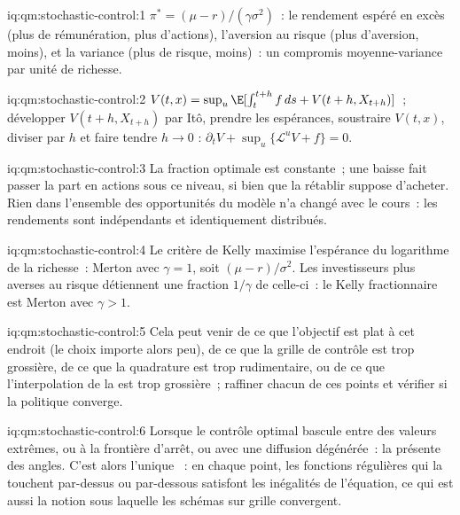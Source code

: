 \begin{solution}{iq:qm:stochastic-control:1}
$\pi^* = (\mu - r)/(\gamma\sigma^2)$~: le rendement espéré en excès (plus de rémunération, plus d'actions), l'aversion au risque (plus d'aversion,
moins), et la variance (plus de risque, moins)~: un compromis moyenne-variance par unité de richesse.
\end{solution}

\begin{solution}{iq:qm:stochastic-control:2}
$V(t, x) = \sup_u\E[\int_t^{t+h}f\,ds + V(t + h, X_{t+h})]$~; développer $V(t + h, X_{t+h})$ par Itô, prendre les espérances, soustraire $V(t,
x)$, diviser par $h$ et faire tendre $h \to 0$ : $\partial_tV + \sup_u\{\mathcal L^uV + f\} = 0$.
\end{solution}

\begin{solution}{iq:qm:stochastic-control:3}
La fraction optimale est constante~; une baisse fait passer la part en actions sous ce niveau, si bien que la rétablir suppose d'acheter. Rien dans
l'ensemble des opportunités du modèle n'a changé avec le cours~: les rendements sont indépendants et identiquement distribués.
\end{solution}

\begin{solution}{iq:qm:stochastic-control:4}
Le critère de Kelly maximise l'espérance du logarithme de la richesse~: Merton avec $\gamma = 1$, soit $(\mu - r)/\sigma^2$. Les investisseurs plus averses au risque détiennent une
fraction $1/\gamma$ de celle-ci~: le Kelly fractionnaire est Merton avec $\gamma > 1$.
\end{solution}

\begin{solution}{iq:qm:stochastic-control:5}
Cela peut venir de ce que l'objectif est plat à cet endroit (le choix importe alors peu), de ce que la grille de contrôle est trop grossière, de ce que la
quadrature est trop rudimentaire, ou de ce que l'interpolation de la  est trop grossière~; raffiner chacun de ces points et vérifier si la politique
converge.
\end{solution}

\begin{solution}{iq:qm:stochastic-control:6}
Lorsque le contrôle optimal bascule entre des valeurs extrêmes, ou à la frontière d'arrêt, ou avec une diffusion dégénérée~: la
 présente des angles. C'est alors l'unique ~: en chaque point, les fonctions régulières qui la touchent
par-dessus ou par-dessous satisfont les inégalités de l'équation, ce qui est aussi la notion sous laquelle les schémas sur grille convergent.
\end{solution}
